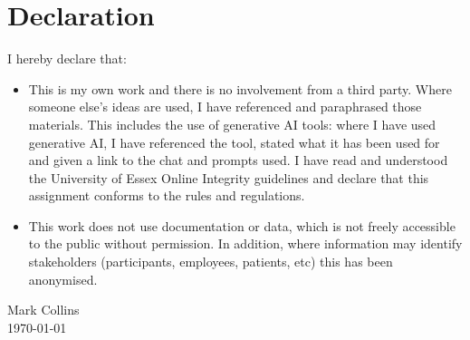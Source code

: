 \chapter*{Declaration}
I hereby declare that:
\begin{itemize}
	\item  This is my own work and there is no involvement from a third party. Where someone else’s ideas are used, I have referenced and paraphrased those materials. This includes the use of generative AI tools: where I have used generative AI, I have referenced the tool, stated what it has been used for and given a link to the chat and prompts used. I have read and understood the University of Essex Online Integrity guidelines and declare that this assignment conforms to the rules and regulations.
	\item This work does not use documentation or data, which is not freely accessible to the public without permission. In addition, where information may identify stakeholders (participants, employees, patients, etc) this has been anonymised. 
\end{itemize}
\begin{flushright}
Mark Collins \\
\monthyeardate\today
\end{flushright}
